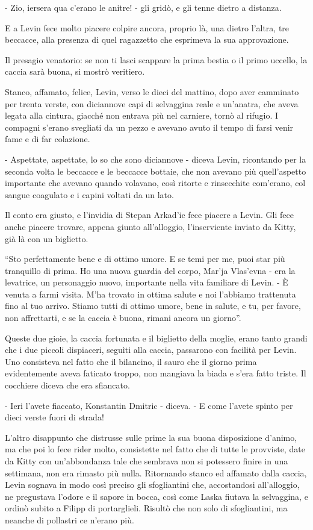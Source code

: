 - Zio, iersera qua c'erano le anitre! - gli gridò, e gli tenne dietro a distanza. 

E a Levin fece molto piacere colpire ancora, proprio là, una dietro l'altra, tre beccacce, alla presenza di quel ragazzetto che esprimeva la sua approvazione. 

\label{xiii-5} 

Il presagio venatorio: se non ti lasci scappare la prima bestia o il primo uccello, la caccia sarà buona, si mostrò veritiero. 

Stanco, affamato, felice, Levin, verso le dieci del mattino, dopo aver camminato per trenta verste, con diciannove capi di selvaggina reale e un'anatra, che aveva legata alla cintura, giacché non entrava più nel carniere, tornò al rifugio. I compagni s'erano svegliati da un pezzo e avevano avuto il tempo di farsi venir fame e di far colazione. 

- Aspettate, aspettate, lo so che sono diciannove - diceva Levin, ricontando per la seconda volta le beccacce e le beccacce bottaie, che non avevano più quell'aspetto importante che avevano quando volavano, così ritorte e rinsecchite com'erano, col sangue coagulato e i capini voltati da un lato. 

Il conto era giusto, e l'invidia di Stepan Arkad'ic fece piacere a Levin. Gli fece anche piacere trovare, appena giunto all'alloggio, l'inserviente inviato da Kitty, già là con un biglietto. 

``Sto perfettamente bene e di ottimo umore. E se temi per me, puoi star più tranquillo di prima. Ho una nuova guardia del corpo, Mar'ja Vlas'evna - era la levatrice, un personaggio nuovo, importante nella vita familiare di Levin. - È venuta a farmi visita. M'ha trovato in ottima salute e noi l'abbiamo trattenuta fino al tuo arrivo. Stiamo tutti di ottimo umore, bene in salute, e tu, per favore, non affrettarti, e se la caccia è buona, rimani ancora un giorno''. 

Queste due gioie, la caccia fortunata e il biglietto della moglie, erano tanto grandi che i due piccoli dispiaceri, seguìti alla caccia, passarono con facilità per Levin. Uno consisteva nel fatto che il bilancino, il sauro che il giorno prima evidentemente aveva faticato troppo, non mangiava la biada e s'era fatto triste. Il cocchiere diceva che era sfiancato. 

- Ieri l'avete fiaccato, Konstantin Dmitric - diceva. - E come l'avete spinto per dieci verste fuori di strada! 

L'altro disappunto che distrusse sulle prime la sua buona disposizione d'animo, ma che poi lo fece rider molto, consistette nel fatto che di tutte le provviste, date da Kitty con un'abbondanza tale che sembrava non si potessero finire in una settimana, non era rimasto più nulla. Ritornando stanco ed affamato dalla caccia, Levin sognava in modo così preciso gli sfogliantini che, accostandosi all'alloggio, ne pregustava l'odore e il sapore in bocca, così come Laska fiutava la selvaggina, e ordinò subito a Filipp di portarglieli. Risultò che non solo di sfogliantini, ma neanche di pollastri ce n'erano più. 

